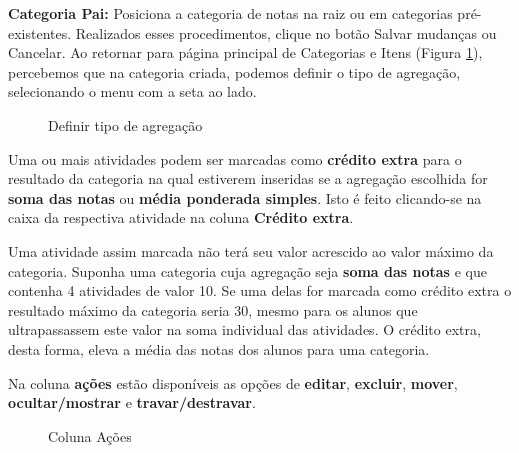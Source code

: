 \textbf{Categoria Pai:} Posiciona a categoria de notas na raiz ou em categorias pré-existentes.
Realizados esses procedimentos, clique no botão Salvar mudanças ou Cancelar.
Ao retornar para página principal de Categorias e Itens (Figura \ref{fig:cap6_14}), percebemos que na categoria criada, podemos definir o tipo de agregação, selecionando o menu com a seta ao lado.
\begin{figure}[htbp]
 \begin{center}
  \caption{Definir tipo de agregação}
  \label{fig:cap6_14}
 \end{center}
\end{figure}

Uma ou mais atividades podem ser marcadas como \textbf{crédito extra} para o resultado da categoria na qual estiverem inseridas se a agregação escolhida for \textbf{soma das notas} ou \textbf{média ponderada simples}. Isto é feito clicando-se na caixa da respectiva atividade na coluna \textbf{Crédito extra}.

Uma atividade assim marcada não terá seu valor acrescido ao valor máximo da categoria. Suponha uma categoria cuja agregação seja \textbf{soma das notas} e que contenha 4 atividades de valor 10. Se uma delas for marcada como crédito extra o resultado máximo da categoria seria 30, mesmo para os alunos que ultrapassassem este valor na soma individual das atividades. O crédito extra, desta forma, eleva a média das notas dos alunos para uma categoria.

Na coluna \textbf{ações} estão disponíveis as opções de \textbf{editar}, \textbf{excluir}, \textbf{mover}, \textbf{ocultar/mostrar} e \textbf{travar/destravar}.
\begin{figure}[htbp]
 \begin{center}
  \caption{Coluna Ações}
  \label{fig:cap6_15}
 \end{center}
\end{figure}

